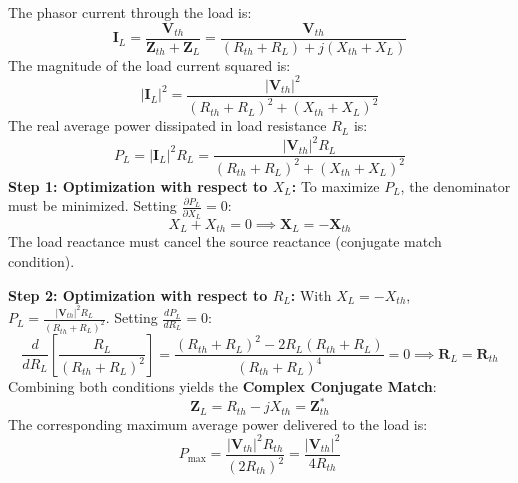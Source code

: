 \documentclass[12pt,a4paper]{article}
\begin{document}
\begin{tcolorbox}[formulabox, title={\textbf{Derivation: Condition for Maximum Average Power Transfer}}]
The phasor current through the load is:
\begin{equation}
  \mathbf{I}_L = \frac{\mathbf{V}_{th}}{\mathbf{Z}_{th} + \mathbf{Z}_L} = \frac{\mathbf{V}_{th}}{(R_{th} + R_L) + j(X_{th} + X_L)}
\end{equation}
The magnitude of the load current squared is:
\begin{equation}
  |\mathbf{I}_L|^2 = \frac{|\mathbf{V}_{th}|^2}{(R_{th} + R_L)^2 + (X_{th} + X_L)^2}
\end{equation}
The real average power dissipated in load resistance $R_L$ is:
\begin{equation}
  P_L = |\mathbf{I}_L|^2 R_L = \frac{|\mathbf{V}_{th}|^2 R_L}{(R_{th} + R_L)^2 + (X_{th} + X_L)^2}
\end{equation}
\textbf{Step 1: Optimization with respect to $X_L$:}
To maximize $P_L$, the denominator must be minimized. Setting $\frac{\partial P_L}{\partial X_L} = 0$:
\begin{equation}
  X_L + X_{th} = 0 \implies \mathbf{X}_L = -\mathbf{X}_{th}
\end{equation}
The load reactance must cancel the source reactance (conjugate match condition).

\textbf{Step 2: Optimization with respect to $R_L$:}
With $X_L = -X_{th}$, $P_L = \frac{|\mathbf{V}_{th}|^2 R_L}{(R_{th} + R_L)^2}$. Setting $\frac{dP_L}{dR_L} = 0$:
\begin{equation}
  \frac{d}{dR_L}\left[ \frac{R_L}{(R_{th} + R_L)^2} \right] = \frac{(R_{th} + R_L)^2 - 2R_L(R_{th} + R_L)}{(R_{th} + R_L)^4} = 0 \implies \mathbf{R}_L = \mathbf{R}_{th}
\end{equation}
Combining both conditions yields the \textbf{Complex Conjugate Match}:
\begin{equation}
  \mathbf{Z}_L = R_{th} - jX_{th} = \mathbf{Z}_{th}^*
\end{equation}
The corresponding maximum average power delivered to the load is:
\begin{equation}
  P_{\max} = \frac{|\mathbf{V}_{th}|^2 R_{th}}{(2R_{th})^2} = \frac{|\mathbf{V}_{th}|^2}{4 R_{th}}
\end{equation}
\end{tcolorbox}
\end{document}
